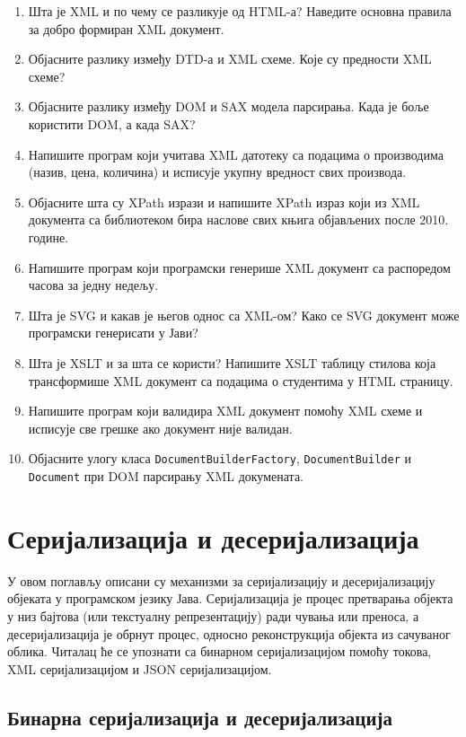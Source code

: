 \begin{enumerate}
\item Шта је XML и по чему се разликује од HTML-а? Наведите основна правила за добро формиран XML документ.
\item Објасните разлику између DTD-а и XML схеме. Које су предности XML схеме?
\item Објасните разлику између DOM и SAX модела парсирања. Када је боље користити DOM, а када SAX?
\item Напишите програм који учитава XML датотеку са подацима о производима (назив, цена, количина) и исписује укупну вредност свих производа.
\item Објасните шта су XPath изрази и напишите XPath израз који из XML документа са библиотеком бира наслове свих књига објављених после 2010. године.
\item Напишите програм који програмски генерише XML документ са распоредом часова за једну недељу.
\item Шта је SVG и какав је његов однос са XML-ом? Како се SVG документ може програмски генерисати у Јави?
\item Шта је XSLT и за шта се користи? Напишите XSLT таблицу стилова која трансформише XML документ са подацима о студентима у HTML страницу.
\item Напишите програм који валидира XML документ помоћу XML схеме и исписује све грешке ако документ није валидан.
\item Објасните улогу класа \texttt{DocumentBuilderFactory}, \texttt{DocumentBuilder} и \texttt{Document} при DOM парсирању XML докумената.
\end{enumerate}


\setlength{\parindent}{15pt}
\setlength{\parskip}{0pt}
\chapter{Серијализација и десеријализација}

У овом поглављу описани су механизми за серијализацију и десеријализацију објеката у програмском језику Јава. Серијализација је процес претварања објекта у низ бајтова (или текстуалну репрезентацију) ради чувања или преноса, а десеријализација је обрнут процес, односно реконструкција објекта из сачуваног облика. Читалац ће се упознати са бинарном серијализацијом помоћу токова, XML серијализацијом и JSON серијализацијом.


\section{Бинарна серијализација и десеријализација}

